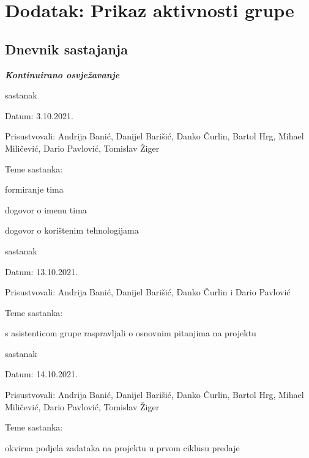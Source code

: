 \chapter*{Dodatak: Prikaz aktivnosti grupe}
		
		\section*{Dnevnik sastajanja}
		
		\textbf{\textit{Kontinuirano osvježavanje}}\\
		
		\begin{packed_enum}
			\item  sastanak
			
			\item[] \begin{packed_item}
				\item Datum: 3.10.2021.
				\item Prisustvovali: Andrija Banić, Danijel Barišić, Danko Čurlin, Bartol Hrg, Mihael Miličević, Dario Pavlović, Tomislav Žiger
				\item Teme sastanka:
				\begin{packed_item}
					\item  formiranje tima
					\item  dogovor o imenu tima
					\item  dogovor o korištenim tehnologijama
				\end{packed_item}
			\end{packed_item}
			
			\item  sastanak
			\item[] \begin{packed_item}
				\item Datum: 13.10.2021.
				\item Prisustvovali: Andrija Banić, Danijel Barišić, Danko Čurlin i Dario Pavlović
				\item Teme sastanka:
				\begin{packed_item}
					\item  s asistenticom grupe raspravljali o osnovnim pitanjima na projektu
				\end{packed_item}
			\end{packed_item}
			
			\item  sastanak
			\item[] \begin{packed_item}
				\item Datum: 14.10.2021.
				\item Prisustvovali: Andrija Banić, Danijel Barišić, Danko Čurlin, Bartol Hrg, Mihael Miličević, Dario Pavlović, Tomislav Žiger
				\item Teme sastanka:
				\begin{packed_item}
					\item  okvirna podjela zadataka na projektu u prvom ciklusu predaje
				\end{packed_item}
			\end{packed_item}
			

\end{packed_enum}
